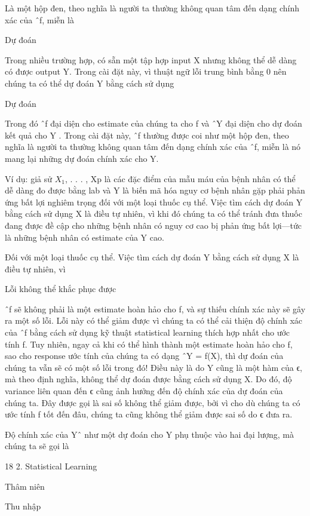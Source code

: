 Là một hộp đen, theo nghĩa là người ta thường không quan tâm đến dạng chính xác của ˆf, miễn là

Dự đoán

Trong nhiều trường hợp, có sẵn một tập hợp input X nhưng không thể dễ dàng có được output Y. Trong cài đặt này, vì thuật ngữ lỗi trung bình bằng 0 nên chúng ta có thể dự đoán Y bằng cách sử dụng

Dự đoán

Trong đó ˆf đại diện cho estimate của chúng ta cho f và ˆY đại diện cho dự đoán kết quả cho Y . Trong cài đặt này, ˆf thường được coi như một hộp đen, theo nghĩa là người ta thường không quan tâm đến dạng chính xác của ˆf, miễn là nó mang lại những dự đoán chính xác cho Y.

Ví dụ: giả sử $X_{1}$, . . . , Xp là các đặc điểm của mẫu máu của bệnh nhân có thể dễ dàng đo được bằng lab và Y là biến mã hóa nguy cơ bệnh nhân gặp phải phản ứng bất lợi nghiêm trọng đối với một loại thuốc cụ thể. Việc tìm cách dự đoán Y bằng cách sử dụng X là điều tự nhiên, vì khi đó chúng ta có thể tránh đưa thuốc đang được đề cập cho những bệnh nhân có nguy cơ cao bị phản ứng bất lợi—tức là những bệnh nhân có estimate của Y cao.

Đối với một loại thuốc cụ thể. Việc tìm cách dự đoán Y bằng cách sử dụng X là điều tự nhiên, vì

Lỗi không thể khắc phục được

ˆf sẽ không phải là một estimate hoàn hảo cho f, và sự thiếu chính xác này sẽ gây ra một số lỗi. Lỗi này có thể giảm được vì chúng ta có thể cải thiện độ chính xác của ˆf bằng cách sử dụng kỹ thuật statistical learning thích hợp nhất cho ước tính f. Tuy nhiên, ngay cả khi có thể hình thành một estimate hoàn hảo cho f, sao cho response ước tính của chúng ta có dạng ˆY = f(X), thì dự đoán của chúng ta vẫn sẽ có một số lỗi trong đó! Điều này là do Y cũng là một hàm của ϵ, mà theo định nghĩa, không thể dự đoán được bằng cách sử dụng X. Do đó, độ variance liên quan đến ϵ cũng ảnh hưởng đến độ chính xác của dự đoán của chúng ta. Đây được gọi là sai số không thể giảm được, bởi vì cho dù chúng ta có ước tính f tốt đến đâu, chúng ta cũng không thể giảm được sai số do ϵ đưa ra.

Độ chính xác của Yˆ như một dự đoán cho Y phụ thuộc vào hai đại lượng, mà chúng ta sẽ gọi là

18 2. Statistical Learning

Thâm niên

Thu nhập

